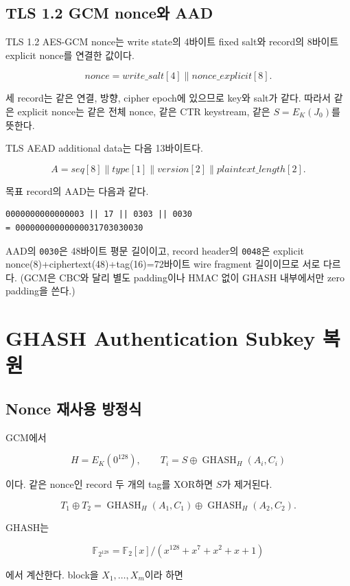 \documentclass[10pt,a4paper]{article}
\begin{document}
\subsection{TLS 1.2 GCM nonce와 AAD}

TLS 1.2 AES-GCM nonce는 write state의 4바이트 fixed salt와 record의
8바이트 explicit nonce를 연결한 값이다.

\[
  \mathit{nonce}=\mathit{write\_salt}[4]\parallel
  \mathit{nonce\_explicit}[8].
\]

세 record는 같은 연결, 방향, cipher epoch에 있으므로 key와 salt가
같다. 따라서 같은 explicit nonce는 같은 전체 nonce, 같은 CTR
keystream, 같은 $S=E_K(J_0)$를 뜻한다.

TLS AEAD additional data는 다음 13바이트다.

\[
  A=\mathit{seq}[8]\parallel\mathit{type}[1]\parallel
  \mathit{version}[2]\parallel\mathit{plaintext\_length}[2].
\]

목표 record의 AAD는 다음과 같다.

\begin{lstlisting}
0000000000000003 || 17 || 0303 || 0030
= 00000000000000031703030030
\end{lstlisting}

AAD의 \texttt{0030}은 48바이트 평문 길이이고, record header의
\texttt{0048}은 explicit nonce(8)+ciphertext(48)+tag(16)=72바이트
wire fragment 길이이므로 서로 다르다. (GCM은 CBC와 달리 별도 padding이나
HMAC 없이 GHASH 내부에서만 zero padding을 쓴다.)

\section{GHASH Authentication Subkey 복원}

\subsection{Nonce 재사용 방정식}

GCM에서

\[
  H=E_K(0^{128}),\qquad
  T_i=S\oplus\operatorname{GHASH}_H(A_i,C_i)
\]

이다. 같은 nonce인 record 두 개의 tag를 XOR하면 $S$가 제거된다.

\[
 T_1\oplus T_2=
 \operatorname{GHASH}_H(A_1,C_1)\oplus
 \operatorname{GHASH}_H(A_2,C_2).
\]

GHASH는

\[
\mathbb F_{2^{128}}=
\mathbb F_2[x]/(x^{128}+x^7+x^2+x+1)
\]

에서 계산한다. block을 $X_1,\ldots,X_m$이라 하면
\end{document}
